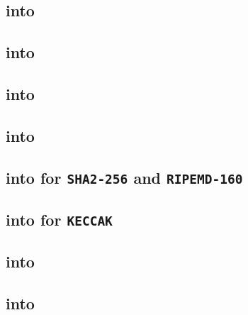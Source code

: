 \subsection{\mmioMod{} into \mmuMod{}}                                                     \label{mmio: lookups: mmu}                         
\subsection{\mmioMod{} into \blkMdxMod{}}                                                  \label{mmio: lookups: blakemodexp}                 
\subsection{\mmioMod{} into \ecDataMod{}}                                                  \label{mmio: lookups: ecdata}                      
\subsection{\mmioMod{} into \logDataMod{}}                                                 \label{mmio: lookups: log}                         
\subsection{\mmioMod{} into \shakiraMod{} for \texttt{SHA2-256} and \texttt{RIPEMD-160}}   \label{mmio: lookups: shakira for sha2 and ripe}   
\subsection{\mmioMod{} into \shakiraMod{} for \texttt{KECCAK}}                             \label{mmio: lookups: shakira for keccak}          
\subsection{\mmioMod{} into \romMod{}}                                                     \label{mmio: lookups: rom}                         
\subsection{\mmioMod{} into \rlpTxnMod{}}                                                  \label{mmio: lookups: txcd}                        
